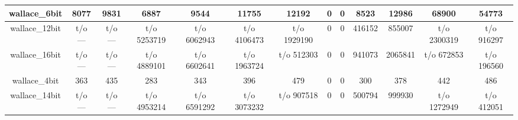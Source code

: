 \begin{sidewaystable}[t]
\begin{tabular}{|c|c|c|c|c|c|c|c|c|c|c|c|c|}
wallace\_6bit  & 8077           & 9831          & 6887            & 9544            & 11755          & 12192          & 0              & 0             & 8523            & 12986           & 68900          & 54773          \\ \hline
wallace\_12bit & t/o ---        & t/o ---       & t/o 5253719     & t/o 6062943     & t/o 4106473    & t/o 1929190    & 0              & 0             & 416152          & 855007          & t/o 2300319    & t/o 916297     \\ \hline
wallace\_16bit & t/o ---        & t/o ---       & t/o 4889101     & t/o 6602641     & t/o 1963724    & t/o 512303     & 0              & 0             & 941073          & 2065841         & t/o 672853     & t/o 196560     \\ \hline
wallace\_4bit  & 363            & 435           & 283             & 343             & 396            & 479            & 0              & 0             & 300             & 378             & 442            & 486            \\ \hline
wallace\_14bit & t/o ---        & t/o ---       & t/o 4953214     & t/o 6591292     & t/o 3073232    & t/o 907518     & 0              & 0             & 500794          & 999930          & t/o 1272949    & t/o 412051     \\ \hline

\end{tabular}
\end{sidewaystable}

